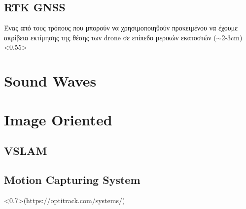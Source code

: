 \subsection{RTK GNSS}
Ένας από τους τρόπους που μπορούν να χρησιμοποιηθούν προκειμένου να έχουμε ακρίβεια εκτίμησης
της θέσης των drone σε επίπεδο μερικών εκατοστών ($\sim$2-3cm)
\cite{rtk-gps-drone-localization}
<0.55>

\section{Sound Waves}

\cite{sound-waves-for-drone-localization}
\cite{audio-based-localization}

\section{Image Oriented}

\subsection{VSLAM}
\cite{vslam-for-drone-localization}

\subsection{Motion Capturing System}
<0.7>(https://optitrack.com/systems/)





